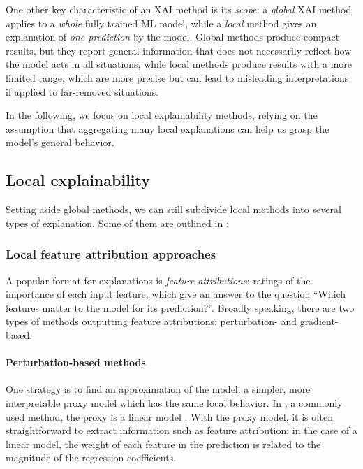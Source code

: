 \documentclass[../main.tex]{subfiles}
\begin{document}
One other key characteristic of an XAI method is its \emph{scope}: a \emph{global} XAI method applies to a \emph{whole} fully trained ML model, while a \emph{local} method gives an explanation of \emph{one prediction} by the model.
Global methods produce compact results, but they report general information that does not necessarily reflect
how the model acts in all situations, while local methods produce results with
a more limited range, which are more precise but can lead to misleading interpretations if applied to far-removed situations.


In the following, we focus on local explainability methods, relying on the assumption that aggregating many local explanations can help us grasp the model's general behavior.

\subsection{Local explainability}

Setting aside global methods, we can still subdivide local methods into several types of explanation.
Some of them are outlined in \cite{bellePrinciples2021}:

\subsubsection{Local feature attribution approaches}

A popular format for explanations is \emph{feature attributions}: ratings of the importance of each input feature, which give an answer to the question ``Which features matter to the model for its prediction?''.
Broadly speaking, there are two types of methods outputting feature attributions: perturbation- and gradient-based.

\paragraph{Perturbation-based methods}

One strategy is to find an approximation of the model: a simpler, more interpretable proxy model which has the same local behavior. In , a commonly used method, the proxy is a linear model \cite{ribeiroWhy2016}.
With the proxy model, it is often straightforward to extract information such as feature attribution: in the case of a linear model, the weight of each feature in the prediction is related to the magnitude of the regression coefficients.
\end{document}
